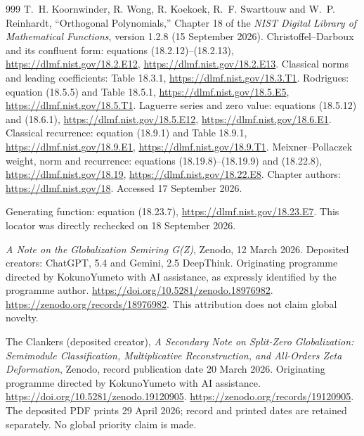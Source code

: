 \documentclass[11pt,a4paper]{article}
\begin{document}
\begin{thebibliography}{999}
T.~H. Koornwinder, R. Wong, R. Koekoek, R.~F. Swarttouw and
W.~P. Reinhardt,
``Orthogonal Polynomials,'' Chapter 18 of the
\emph{NIST Digital Library of Mathematical Functions},
version 1.2.8 (15 September 2026).
Christoffel--Darboux and its confluent form: equations (18.2.12)--(18.2.13),
\url{https://dlmf.nist.gov/18.2.E12},
\url{https://dlmf.nist.gov/18.2.E13}.
Classical norms and leading coefficients: Table 18.3.1,
\url{https://dlmf.nist.gov/18.3.T1}.
Rodrigues: equation (18.5.5) and Table 18.5.1,
\url{https://dlmf.nist.gov/18.5.E5},
\url{https://dlmf.nist.gov/18.5.T1}.
Laguerre series and zero value: equations (18.5.12) and (18.6.1),
\url{https://dlmf.nist.gov/18.5.E12},
\url{https://dlmf.nist.gov/18.6.E1}.
Classical recurrence: equation (18.9.1) and Table 18.9.1,
\url{https://dlmf.nist.gov/18.9.E1},
\url{https://dlmf.nist.gov/18.9.T1}.
Meixner--Pollaczek weight, norm and recurrence:
equations (18.19.8)--(18.19.9) and (18.22.8),
\url{https://dlmf.nist.gov/18.19},
\url{https://dlmf.nist.gov/18.22.E8}.
Chapter authors: \url{https://dlmf.nist.gov/18}.
Accessed 17 September 2026.


Generating function: equation (18.23.7),
\url{https://dlmf.nist.gov/18.23.E7}.
This locator was directly rechecked on 18 September 2026.

\emph{A Note on the Globalization Semiring G(Z)}, Zenodo,
12 March 2026. Deposited creators: ChatGPT, 5.4 and Gemini, 2.5 DeepThink.
Originating programme directed by KokunoYumeto with AI assistance,
as expressly identified by the programme author.
\url{https://doi.org/10.5281/zenodo.18976982}.
\url{https://zenodo.org/records/18976982}.
This attribution does not claim global novelty.

The Clankers (deposited creator), \emph{A Secondary Note on Split-Zero
Globalization: Semimodule Classification, Multiplicative Reconstruction,
and All-Orders Zeta Deformation}, Zenodo, record publication date
20 March 2026. Originating programme directed by KokunoYumeto
with AI assistance. \url{https://doi.org/10.5281/zenodo.19120905}.
\url{https://zenodo.org/records/19120905}.
The deposited PDF prints 29 April 2026; record and printed dates
are retained separately. No global priority claim is made.


\end{thebibliography}
\end{document}
